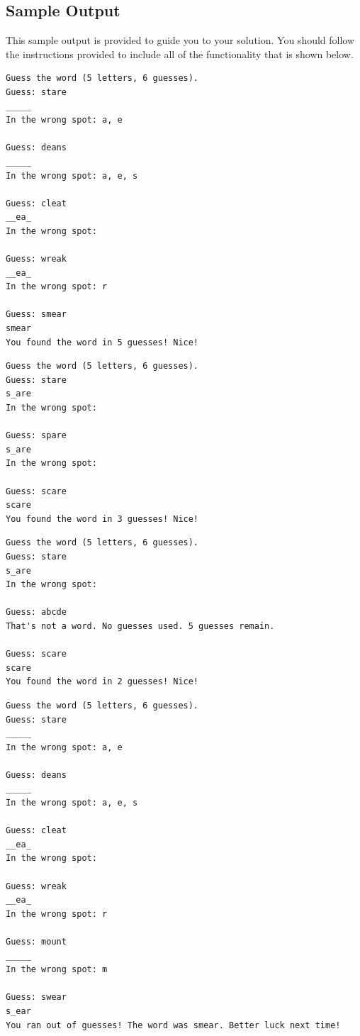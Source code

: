 \subsection*{Sample Output}
This sample output is provided to guide you to your solution. You should follow the instructions provided to include all of the functionality that is shown below.
\begin{lstlisting}[style=none]
Guess the word (5 letters, 6 guesses).
Guess: stare
_____
In the wrong spot: a, e

Guess: deans
_____
In the wrong spot: a, e, s

Guess: cleat
__ea_
In the wrong spot: 

Guess: wreak
__ea_
In the wrong spot: r

Guess: smear
smear
You found the word in 5 guesses! Nice!
\end{lstlisting}
\begin{lstlisting}[style=none]
Guess the word (5 letters, 6 guesses).
Guess: stare
s_are
In the wrong spot: 

Guess: spare
s_are
In the wrong spot:

Guess: scare
scare
You found the word in 3 guesses! Nice!
\end{lstlisting}
\begin{lstlisting}[style=none]
Guess the word (5 letters, 6 guesses).
Guess: stare
s_are
In the wrong spot: 

Guess: abcde
That's not a word. No guesses used. 5 guesses remain.

Guess: scare
scare
You found the word in 2 guesses! Nice!
\end{lstlisting}
\begin{lstlisting}[style=none]
Guess the word (5 letters, 6 guesses).
Guess: stare
_____
In the wrong spot: a, e

Guess: deans
_____
In the wrong spot: a, e, s

Guess: cleat
__ea_
In the wrong spot: 

Guess: wreak
__ea_
In the wrong spot: r

Guess: mount
_____
In the wrong spot: m

Guess: swear
s_ear
You ran out of guesses! The word was smear. Better luck next time!
\end{lstlisting}
